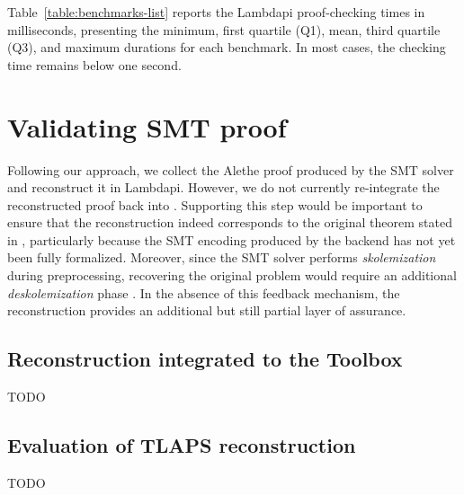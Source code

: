 Table~\ref{table:benchmarks-list} reports the Lambdapi proof-checking times in milliseconds, presenting the minimum, first quartile (Q1), mean, third quartile (Q3), and maximum durations for each benchmark.
In most cases, the checking time remains below one second.

\section{Validating \tlaplus SMT proof}
\label{sec:tla-eval}

Following our approach, we collect the Alethe proof produced by the SMT solver and reconstruct it in Lambdapi.
However, we do not currently re-integrate the reconstructed proof back into \tlaplus.
Supporting this step would be important to ensure that the reconstruction indeed corresponds to the original theorem stated in \tlaplus, particularly because the SMT encoding produced by the backend has not yet been fully formalized.
Moreover, since the SMT solver performs \emph{skolemization} during preprocessing, recovering the original problem would require an additional \emph{deskolemization} phase \cite{desko}.
In the absence of this feedback mechanism, the reconstruction provides an additional but still partial layer of assurance.


\subsection{Reconstruction integrated to the Toolbox}
\label{ssec:tlaps-toolbox}

TODO

\subsection{Evaluation of TLAPS reconstruction}
\label{ssec:tlaps-evaluation-results}

TODO